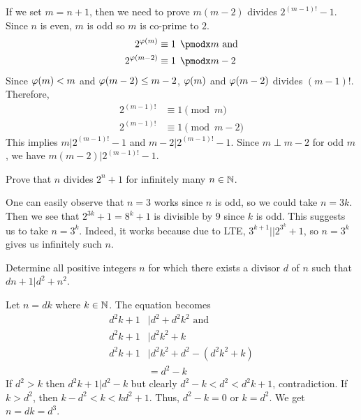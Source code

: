 \documentclass[problems.tex]{subfile}
\begin{document}
	\begin{solution}
		If we set $m=n+1$, then we need to prove $m(m-2)$ divides $2^{(m-1)!}-1$. Since $n$ is even, $m$ is odd so $m$ is co-prime to $2$. 
			\begin{align*}
				2^{\t (m)} &\equiv1\pmod m\text{ and}\\
				2^{\t (m-2)} &\equiv1\pmod{m-2}
			\end{align*}
		Since $\varphi(m)<m$ and $\varphi (m-2)\leq m-2$, $\varphi (m)$ and $\varphi (m-2)$ divides $(m-1)!$. Therefore,
			\begin{align*}
				2^{(m-1)!} & \equiv1\pmod m\\
				2^{(m-1)!} & \equiv1\pmod{m-2}
			\end{align*}
		This implies $m|2^{(m-1)!}-1$ and $m-2|2^{(m-1)!}-1$. Since $m\perp m-2$ for odd $m$, we have $m(m-2)|2^{(m-1)!}-1$.
	\end{solution}
	
	
	
	
	\begin{problem}
		Prove that $n$ divides $2^n+1$ for infinitely many $n\in\mathbb{N}$.
	\end{problem}
	
	\begin{solution}
		One can easily observe that $n=3$ works since $n$ is odd, so we could take $n=3k$. Then we see that $2^{3k}+1=8^k+1$ is divisible by $9$ since $k$ is odd. This suggests us to take $n=3^k$. Indeed, it works because due to LTE, $3^{k+1}||2^{3^k}+1$, so $n=3^k$ gives us infinitely such $n$.
	\end{solution}
	
	\begin{problem}[Croatia $2015$]
		Determine all positive integers $n$ for which there exists a divisor $d$ of $n$ such that $dn+1|d^2+n^2$.
	\end{problem}
	
	\begin{solution}
		Let $n=dk$ where $k\in\mathbb{N}$. The equation becomes
			\begin{align*}
				d^2k+1 & |d^2+d^2k^2\text{ and}\\
				d^2k+1 & |d^2k^2+k\\
				d^2k+1 & |d^2k^2+d^2-(d^2k^2+k)\\
					   & = d^2-k
			\end{align*}
		If $d^2>k$ then $d^2k+1|d^2-k$ but clearly $d^2-k<d^2<d^2k+1$, contradiction. If $k>d^2$, then $k-d^2<k<kd^2+1$. Thus, $d^2-k=0$ or $k=d^2$. We get $n=dk=d^3$.
	\end{solution}
	
\end{document}
